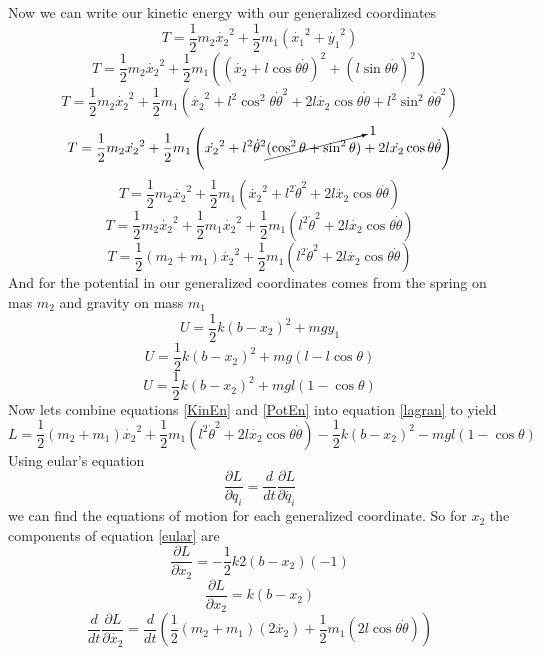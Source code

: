 \documentclass[11pt]{article}
\numberwithin{equation}{section}
\begin{document}
\begin{enumerate}[(a)]
Now we can write our kinetic energy with our generalized coordinates
$$T = \frac{1}{2} m_2 \dot{x_2}^2 + \frac{1}{2} m_1 \left(\dot{x_1}^2 + \dot{y_1}^2\right)$$
$$T = \frac{1}{2} m_2 \dot{x_2}^2 + \frac{1}{2} m_1 \left((\dot{x_2} + l\cos{\theta}\dot{\theta})^2 + (l\sin{\theta}\dot{\theta})^2\right)$$
$$T = \frac{1}{2} m_2 \dot{x_2}^2 + \frac{1}{2} m_1 \left(\dot{x_2}^2 + l^2\cos^2{\theta}\dot{\theta}^2 + 2l\dot{x_2}\cos{\theta}\dot{\theta} + l^2\sin^2{\theta}\dot{\theta}^2\right)$$
$$T = \frac{1}{2} m_2 \dot{x_2}^2 + \frac{1}{2} m_1 \left(\dot{x_2}^2 + l^2\dot{\theta}^2 \cancelto{1}{(\cos^2{\theta}+\sin^2{\theta})} + 2l\dot{x_2}\cos{\theta}\dot{\theta}\right)$$
$$T = \frac{1}{2} m_2 \dot{x_2}^2 + \frac{1}{2} m_1 \left(\dot{x_2}^2 + l^2\dot{\theta}^2 + 2l\dot{x_2}\cos{\theta}\dot{\theta}\right)$$
$$T = \frac{1}{2} m_2 \dot{x_2}^2 + \frac{1}{2} m_1 \dot{x_2}^2 +\frac{1}{2} m_1 \left( l^2\dot{\theta}^2 + 2l\dot{x_2}\cos{\theta}\dot{\theta}\right)$$
\begin{equation}
T = \frac{1}{2} (m_2 + m_1) \dot{x_2}^2 + \frac{1}{2} m_1 \left( l^2\dot{\theta}^2 + 2l\dot{x_2}\cos{\theta}\dot{\theta}\right)
\label{KinEn}
\end{equation}
And for the potential in our generalized coordinates comes from the spring on mas $m_2$ and gravity on mass $m_1$
$$U = \frac{1}{2}k(b - x_2)^2 + mgy_1$$
$$U = \frac{1}{2}k(b - x_2)^2 + mg(l-l\cos{\theta})$$
\begin{equation}
U = \frac{1}{2}k(b - x_2)^2 + mgl(1-\cos{\theta})
\label{PotEn}
\end{equation}
Now lets combine equations \ref{KinEn} and \ref{PotEn} into equation \ref{lagran} to yield
\begin{equation}
L = \frac{1}{2} (m_2 + m_1) \dot{x_2}^2 + \frac{1}{2} m_1 \left( l^2\dot{\theta}^2 + 2l\dot{x_2}\cos{\theta}\dot{\theta}\right) - \frac{1}{2}k(b - x_2)^2 - mgl(1-\cos{\theta})
\label{ProbLagran}
\end{equation}
Using eular's equation
\begin{equation}
\frac{\partial L}{\partial q_i} = \frac{d}{dt}\frac{\partial L}{\partial \dot{q_i}}
\label{eular}
\end{equation}
we can find the equations of motion for each generalized coordinate. So for $x_2$ the components of equation \ref{eular} are
$$\frac{\partial L}{\partial x_2} = -\frac{1}{2}k2(b-x_2)(-1)$$
$$\frac{\partial L}{\partial x_2} = k(b-x_2)$$
$$\frac{d}{dt}\frac{\partial L}{\partial \dot{x_2}} = \frac{d}{dt}\left(\frac{1}{2}(m_2 + m_1) (2\dot{x_2}) + \frac{1}{2}m_1(2l\cos{\theta}\dot{\theta})\right)$$

\end{enumerate}
\end{document}
